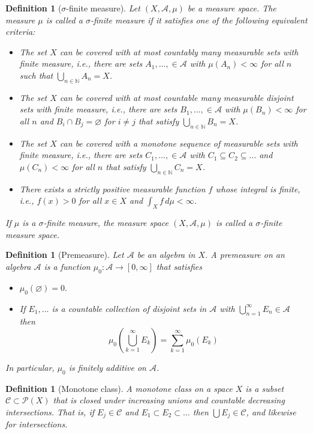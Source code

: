 \documentclass[11pt, letter]{book}
\newtheorem{definition}[theorem]{Definition}
\newcommand{\lp}{\left(}
\newcommand{\rp}{\right)}
\begin{document}
\begin{definition}[$\sigma$-finite measure]
Let $(X,\mathcal{A}, \mu)$ be a measure space. The measure $\mu$ is called a $\sigma$-finite measure if it satisfies one of the following equivalent criteria:
\begin{itemize}
    \item The set $X$ can be covered with at most countably many measurable sets with finite measure, i.e., there are sets $A_1,\dots, \in \mathcal{A}$ with $\mu(A_n)< \infty$ for all $n$ such that $\bigcup_{n\in \mathbb{N}} A_n = X$.
    \item The set $X$ can be covered with at most countable many measurable disjoint sets with finite measure, i.e., there are sets $B_1,\dots, \in \mathcal{A}$ with $\mu(B_n) < \infty$ for all $n$ and $B_i \cap B_j = \varnothing$ for $i\neq j$ that satisfy $\bigcup_{n\in \mathbb{N}} B_n = X$.
    \item The set $X$ can be covered with a monotone sequence of measurable sets with finite measure, i.e., there are sets $C_1,\dots, \in \mathcal{A}$ with $C_1 \subseteq C_2 \subseteq \dots$ and $\mu(C_n) < \infty$ for all $n$ that satisfy $\bigcup_{n\in \mathbb{N}} C_n = X$.
    \item There exists a strictly positive measurable function $f$ whose integral is finite, i.e., $f(x) > 0$ for all $x\in X$ and $\int_X f\,d\mu < \infty$. 
\end{itemize}
If $\mu$ is a $\sigma$-finite measure, the measure space $(X,\mathcal{A},\mu)$ is called a $\sigma$-finite measure space. 
\end{definition}
\begin{definition}[Premeasure]
Let $\mathcal{A}$ be an algebra in $X$. A premeasure on an algebra $\mathcal{A}$ is a function $\mu_0 : \mathcal{A} \to [0,\infty]$ that satisfies 
\begin{itemize}
    \item $\mu_0(\varnothing) = 0.$
    \item If $E_1,\dots$ is a countable collection of disjoint sets in $\mathcal{A}$ with $\bigcup^\infty_{n=1}E_n \in \mathcal{A}$ then 
    \begin{equation*}
        \mu_0 \lp \bigcup^\infty_{k=1} E_k \rp = \sum^\infty_{k=1} \mu_0 (E_k)
    \end{equation*}
\end{itemize}
In particular, $\mu_0$ is finitely additive on $\mathcal{A}$. 
\end{definition}
\begin{definition}[Monotone class]
A monotone class on a space $X$ is a subset $\mathcal{C}\subset \mathcal{P}(X)$ that is closed under increasing unions and countable decreasing intersections. That is, if $E_j \in \mathcal{C}$ and $E_1 \subset E_2 \subset \dots$ then $\bigcup E_j \in \mathcal{C}$, and likewise for intersections.
\end{definition}
\end{document}
